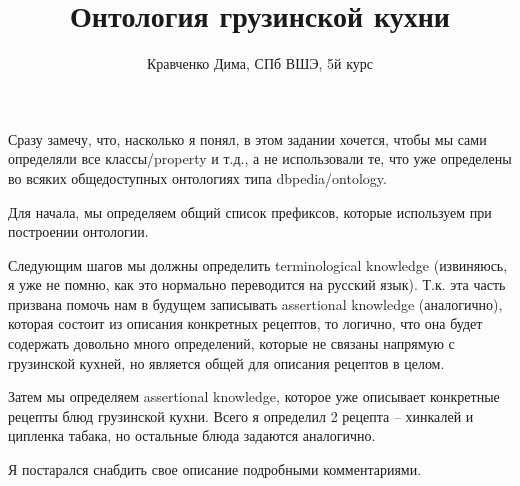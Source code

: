 \documentclass{article}
\begin{document}
\title{Онтология грузинской кухни}
\author{Кравченко Дима, СПб ВШЭ, 5й курс}

\maketitle

Сразу замечу, что, насколько я понял, в этом задании хочется, чтобы мы сами определяли
все классы/property и т.д., а не использовали те, что уже определены во всяких общедоступных
онтологиях типа dbpedia/ontology.

Для начала, мы определяем общий список префиксов, которые используем при построении онтологии.

Следующим шагов мы должны определить terminological knowledge (извиняюсь, я уже
не помню, как это нормально переводится на русский язык). Т.к. эта часть призвана
помочь нам в будущем записывать assertional knowledge (аналогично), которая состоит
из описания конкретных рецептов, то логично, что она будет содержать довольно много
определений, которые не связаны напрямую с грузинской кухней, но является общей для
описания рецептов в целом.

Затем мы определяем assertional knowledge, которое уже описывает конкретные рецепты блюд
грузинской кухни. Всего я определил 2 рецепта -- хинкалей и ципленка табака, но остальные
блюда задаются аналогично.

Я постарался снабдить свое описание подробными комментариями.
\end{document}
